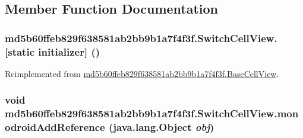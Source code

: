 \subsection{Member Function Documentation}
\hypertarget{classmd5b60ffeb829f638581ab2bb9b1a7f4f3f_1_1_switch_cell_view_b1715a4890387a38bb406c97d7c77468}{
\subsubsection[{[static initializer]}]{\setlength{\rightskip}{0pt plus 5cm}md5b60ffeb829f638581ab2bb9b1a7f4f3f.SwitchCellView.\mbox{[}static initializer\mbox{]} ()}}
\label{classmd5b60ffeb829f638581ab2bb9b1a7f4f3f_1_1_switch_cell_view_b1715a4890387a38bb406c97d7c77468}




Reimplemented from \hyperlink{classmd5b60ffeb829f638581ab2bb9b1a7f4f3f_1_1_base_cell_view_f945c6cd310f27f3f6ed7c0198a20d8c}{md5b60ffeb829f638581ab2bb9b1a7f4f3f.BaseCellView}.\hypertarget{classmd5b60ffeb829f638581ab2bb9b1a7f4f3f_1_1_switch_cell_view_6526a7d8e09d4f580f9ba2058b1a31b7}{
\subsubsection[{monodroidAddReference}]{\setlength{\rightskip}{0pt plus 5cm}void md5b60ffeb829f638581ab2bb9b1a7f4f3f.SwitchCellView.monodroidAddReference (java.lang.Object {\em obj})}}
\label{classmd5b60ffeb829f638581ab2bb9b1a7f4f3f_1_1_switch_cell_view_6526a7d8e09d4f580f9ba2058b1a31b7}




